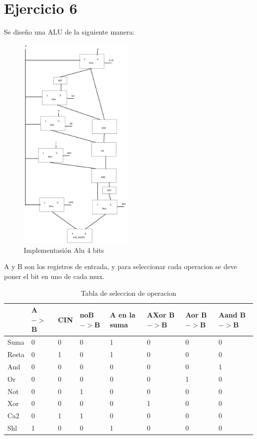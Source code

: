 \documentclass[../../../informe/src/main.tex]{subfiles}
\begin{document}
\section{Ejercicio 6}

Se diseño una ALU de la siguiente manera:
\begin{figure}[H]
\centering
\includegraphics[width=0.5\textwidth]{imagenes/alu.png}
\caption{Implementasión Alu 4 bits} \label{fig=alu}
\end{figure}
 A y B son los registros de entrada, y para seleccionar cada operacion se deve poner el bit en uno de cada mux.

\begin{table}[h]
\begin{center}
\begin{tabular}{|l|l|l|l|l|l|l|l|}
\hline
&A$->$B & CIN &noB$->$B  &  A en la suma & AXor B$->$B & Aor B$->$B &Aand B$->$B\\
\hline \hline
 Suma& 0 & 0 & 0 & 1 & 0&0 &0 \\ \hline
Resta& 0 & 1 & 0 & 1 & 0&0 &0 \\ \hline
 And& 0 & 0 & 0 & 0 & 0&0 &1 \\ \hline
 Or& 0 & 0 & 0 & 0 & 0&1 &0 \\ \hline
 Not& 0 & 0 & 1 & 0 & 0&0 &0 \\ \hline
 Xor& 0 & 0 & 0 & 0 & 1&0 &0 \\ \hline
 Ca2& 0 & 1 & 1& 0& 0&0 &0 \\ \hline
Shl& 1 & 0 & 0 & 1 & 0&0 &0 \\ \hline

\end{tabular}
\caption{Tabla de seleccion de operacion} 
\label{tab=alu op}
\end{center}
\end{table}
\end{document}
